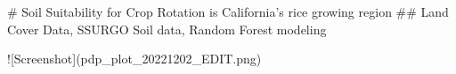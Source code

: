 # Soil Suitability for Crop Rotation is California's rice growing region  
## Land Cover Data, SSURGO Soil data, Random Forest modeling  




![Screenshot](pdp_plot_20221202_EDIT.png)